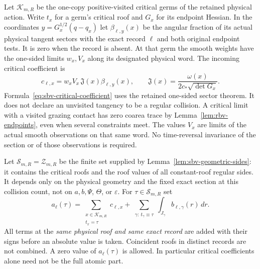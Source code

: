 Let $\mathcal K_{m,R}$ be the one-copy positive-visited critical
germs of the retained physical action.  Write $t_x$ for a germ's
critical roof and $G_x$ for its endpoint Hessian.  In the coordinates
$y=G_x^{1/2}(q-q_x)$ let $\beta_{\ell,y}(x)$ be the angular fraction
of its actual physical tangent sectors with the exact record $\ell$
and both original endpoint tests.  It is zero when the record is
absent.  At that germ the smooth weights have the one-sided limits
$w_x,V_x$ along its designated physical word.  The incoming
critical coefficient is
\begin{equation}\label{eq:sbv-critical-coefficient}
 c_{\ell,x}=w_xV_x\,\mathfrak J(x)\beta_{\ell,y}(x),
 \qquad \mathfrak J(x)=\frac{\omega(x)}{2c_*\sqrt{\det G_x}}.
\end{equation}
Formula~\eqref{eq:sbv-critical-coefficient} uses the retained
one-sided sector theorem.  It does not declare an unvisited
tangency to be a regular collision.  A critical limit with a visited
grazing contact has zero coarea trace by
Lemma~\ref{lem:rbv-endpoints}, even when several constraints meet.
The values $V_x$ are limits of the actual smooth observations on
that same word.  No time-reversal invariance of the section or of
those observations is required.

Let $\mathcal S_{m,R}=\mathcal Z_{m,R}$ be the finite set supplied
by Lemma~\ref{lem:sbv-geometric-sides}: it contains the critical roofs and the roof values of all
constant-roof regular sides.  It depends only on the physical
geometry and the fixed exact section at this collision count,
not on $a,b,\Psi$, $\Theta$, or $\varepsilon$.  For
$\tau\in\mathcal S_{m,R}$ set
\begin{equation}\label{eq:sbv-atomic-coefficient}
 a_\ell(\tau)
  =\sum_{\substack{x\in\mathcal K_{m,R}\\t_x=\tau}}c_{\ell,x}
    +\sum_{\substack{\gamma:\ t_\gamma\equiv\tau}}
                             \int_{J_\gamma}b_{\ell,\gamma}(r)\,dr.
\end{equation}
All terms at the \emph{same physical roof and same exact record}
are added with their signs before an absolute value is taken.
Coincident roofs in distinct records are not combined.  A zero
value of $a_\ell(\tau)$ is allowed.  In particular critical
coefficients alone need not be the full atomic part.

